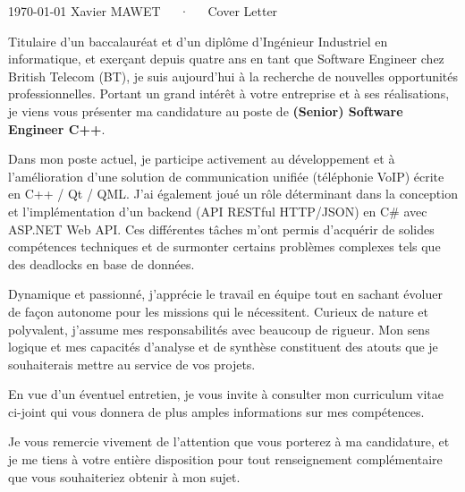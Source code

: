 \documentclass[11pt, a4paper]{custom-awesome-cv}
\begin{document}
\makecvheader
\makecvfooter
  {\today} %
  {Xavier MAWET~~~·~~~Cover Letter} %
  {\thepage} %

\makelettertitle

\begin{cvletter}

Titulaire d'un baccalauréat et d'un diplôme d'Ingénieur Industriel en informatique, et exerçant depuis quatre ans en tant que Software Engineer chez British Telecom (BT), je suis aujourd'hui à la recherche de nouvelles opportunités professionnelles.
Portant un grand intérêt à votre entreprise et à ses réalisations, je viens vous présenter ma candidature au poste de \textbf{(Senior) Software Engineer C++}.

Dans mon poste actuel, je participe activement au développement et à l'amélioration d'une solution de communication unifiée (téléphonie VoIP) écrite en C++ / Qt / QML.
J'ai également joué un rôle déterminant dans la conception et l'implémentation d'un backend (API RESTful HTTP/JSON) en C\# avec ASP.NET Web API.
Ces différentes tâches m'ont permis d'acquérir de solides compétences techniques et de surmonter certains problèmes complexes tels que des deadlocks en base de données.

Dynamique et passionné, j'apprécie le travail en équipe tout en sachant évoluer de façon autonome pour les missions qui le nécessitent.
Curieux de nature et polyvalent, j'assume mes responsabilités avec beaucoup de rigueur.
Mon sens logique et mes capacités d'analyse et de synthèse constituent des atouts que je souhaiterais mettre au service de vos projets.

En vue d'un éventuel entretien, je vous invite à consulter mon curriculum vitae ci-joint qui vous donnera de plus amples informations sur mes compétences.

Je vous remercie vivement de l'attention que vous porterez à ma candidature, et je me tiens à votre entière disposition pour tout renseignement complémentaire que vous souhaiteriez obtenir à mon sujet.

\end{cvletter}

\makeletterclosing
\end{document}
